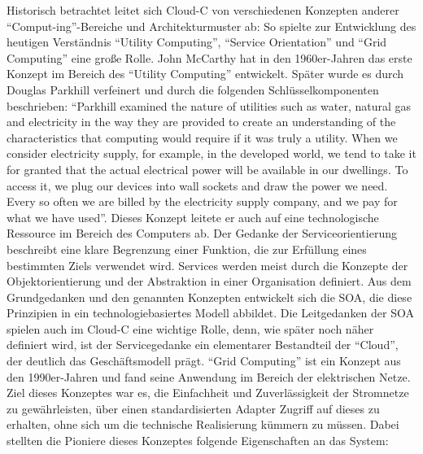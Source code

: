 Historisch betrachtet leitet sich \ac{Cloud-C} von verschiedenen Konzepten anderer \enquote{Comput-ing}-Bereiche und Architekturmuster ab: So spielte zur Entwicklung des heutigen Verständnis \enquote{Utility Computing}, \enquote{Service Orientation} und \enquote{Grid Computing} eine große Rolle.\autocite[vgl.][S.\,3-5]{hill_guide_2013} John McCarthy hat in den 1960er-Jahren das erste Konzept im Bereich des \enquote{Utility Computing} entwickelt.\autocite[vgl.][]{mccarthy_reminiscences_1983} Später wurde es durch Douglas Parkhill verfeinert und durch die folgenden Schlüsselkomponenten beschrieben: \enquote{Parkhill examined the nature of utilities such as water, natural gas and electricity in the way they are provided to create an understanding of the characteristics that computing would require if it was truly a utility. When we consider electricity supply, for example, in the developed world, we tend to take it for granted that the actual electrical power will be available in our dwellings. To access it, we plug our devices into wall sockets and draw the power we need. Every so often we are billed by the electricity supply company, and we pay for what we have used}.\autocite[vgl.][]{parkhill_challenge_1966} Dieses Konzept leitete er auch auf eine technologische Ressource im Bereich des Computers ab.\autocite[vgl.][S.\,4]{hill_guide_2013} Der Gedanke der Serviceorientierung beschreibt eine klare Begrenzung einer Funktion, die zur Erfüllung eines bestimmten Ziels verwendet wird. Services werden meist durch die Konzepte der Objektorientierung und der Abstraktion in einer Organisation definiert. Aus dem Grundgedanken und den genannten Konzepten entwickelt sich die \ac{SOA}, die diese Prinzipien in ein technologiebasiertes Modell abbildet. Die Leitgedanken der \ac{SOA} spielen auch im \ac{Cloud-C} eine wichtige Rolle, denn, wie später noch näher definiert wird, ist der Servicegedanke ein elementarer Bestandteil der \enquote{Cloud}, der deutlich das Geschäftsmodell prägt. \enquote{Grid Computing} ist ein Konzept aus den 1990er-Jahren und fand seine Anwendung im Bereich der elektrischen Netze.\autocite[vgl.][]{weinhardt_cloud_2009} Ziel dieses Konzeptes war es, die Einfachheit und Zuverlässigkeit der Stromnetze zu gewährleisten, über einen standardisierten Adapter Zugriff auf dieses zu erhalten, ohne sich um die technische Realisierung kümmern zu müssen. Dabei stellten die Pioniere dieses Konzeptes folgende Eigenschaften\autocite[vgl.][]{foster_grid_1999} an das System:

